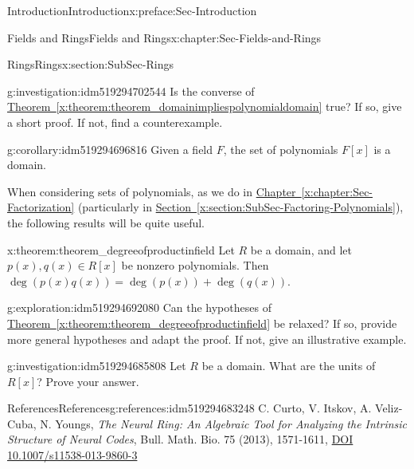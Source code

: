 \documentclass[oneside,10pt,]{book}
\newcommand{\xreffont}{\relax}
\numberwithin{equation}{section}
\begin{document}
\begin{preface}{Introduction}{}{Introduction}{}{}{x:preface:Sec-Introduction}
\begin{chapterptx}{Fields and Rings}{}{Fields and Rings}{}{}{x:chapter:Sec-Fields-and-Rings}
\begin{sectionptx}{Rings}{}{Rings}{}{}{x:section:SubSec-Rings}
\begin{investigation}{}{g:investigation:idm519294702544}
Is the converse of \hyperref[x:theorem:theorem_domainimpliespolynomialdomain]{Theorem~{\xreffont\ref{x:theorem:theorem_domainimpliespolynomialdomain}}} true? If so, give a short proof. If not, find a counterexample.%
\end{investigation}
\begin{corollary}{}{}{g:corollary:idm519294696816}%
Given a field \(F\), the set of polynomials \(F[x]\) is a domain.%
\end{corollary}
When considering sets of polynomials, as we do in \hyperref[x:chapter:Sec-Factorization]{Chapter~{\xreffont\ref{x:chapter:Sec-Factorization}}} (particularly in \hyperref[x:section:SubSec-Factoring-Polynomials]{Section~{\xreffont\ref{x:section:SubSec-Factoring-Polynomials}}}), the following results will be quite useful.%
\begin{theorem}{}{}{x:theorem:theorem_degreeofproductinfield}%
Let \(R\) be a domain, and let \(p(x),q(x)\in R[x]\) be nonzero polynomials. Then \(\deg(p(x) q(x)) = \deg(p(x)) + \deg(q(x))\).%
\end{theorem}
\begin{exploration}{}{g:exploration:idm519294692080}%
Can the hypotheses of \hyperref[x:theorem:theorem_degreeofproductinfield]{Theorem~{\xreffont\ref{x:theorem:theorem_degreeofproductinfield}}} be relaxed? If so, provide more general hypotheses and adapt the proof. If not, give an illustrative example.%
\end{exploration}
\begin{investigation}{}{g:investigation:idm519294685808}%
Let \(R\) be a domain. What are the units of \(R[x]\)? Prove your answer.%
\end{investigation}
%
%
\typeout{************************************************}
\typeout{************************************************}
%
\begin{references-subsection-numberless}{References}{}{References}{}{}{g:references:idm519294683248}
C. Curto, V. Itskov, A. Veliz-Cuba, N. Youngs, \emph{The Neural Ring: An Algebraic Tool for Analyzing the Intrinsic Structure of Neural Codes}, Bull. Math. Bio. 75 (2013), 1571-1611, \href{https://doi.org/10.1007/s11538-013-9860-3}{DOI 10.1007\slash{}s11538-013-9860-3}\end{references-subsection-numberless}
\end{sectionptx}
%
%
\typeout{************************************************}
\typeout{************************************************}

\end{chapterptx}
\end{preface}
\end{document}

